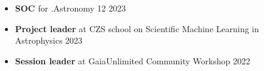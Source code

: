 \begin{itemize}
    \item \textbf{SOC} for .Astronomy 12 \hfill 2023
    \item \textbf{Project leader} at CZS school on Scientific Machine Learning in Astrophysics \hfill 2023
    \item \textbf{Session leader} at GaiaUnlimited Community Workshop \hfill 2022
\end{itemize}